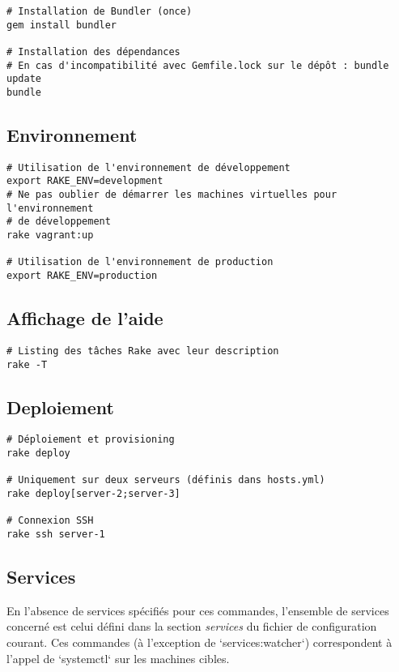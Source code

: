 \documentclass[a4paper,oneside,12pt]{article}
\begin{document}
\begin{verbatim}
# Installation de Bundler (once)
gem install bundler

# Installation des dépendances
# En cas d'incompatibilité avec Gemfile.lock sur le dépôt : bundle update
bundle
\end{verbatim}

\subsection{Environnement}

\begin{verbatim}
# Utilisation de l'environnement de développement
export RAKE_ENV=development
# Ne pas oublier de démarrer les machines virtuelles pour l'environnement 
# de développement
rake vagrant:up

# Utilisation de l'environnement de production
export RAKE_ENV=production
\end{verbatim}

\subsection{Affichage de l'aide}

\begin{verbatim}
# Listing des tâches Rake avec leur description
rake -T
\end{verbatim}

\subsection{Deploiement}

\begin{verbatim}
# Déploiement et provisioning
rake deploy

# Uniquement sur deux serveurs (définis dans hosts.yml)
rake deploy[server-2;server-3]

# Connexion SSH
rake ssh server-1
\end{verbatim}

\subsection{Services}

En l'absence de services spécifiés pour ces commandes, l'ensemble de services
concerné est celui défini dans la section \textit{services} du fichier de configuration
courant. Ces commandes (à l'exception de `services:watcher`) correspondent
à l'appel de `systemctl` sur les machines cibles.
\end{document}
